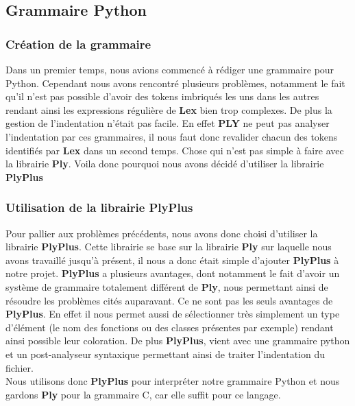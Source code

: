 \documentclass[a4paper,12pt]{article}
\begin{document}
	\subsection{Grammaire Python}

		\subsubsection{Création de la grammaire}

			Dans un premier temps, nous avions commencé à rédiger une grammaire pour Python. Cependant nous avons rencontré plusieurs problèmes, notamment le fait qu'il n'est pas possible d'avoir des tokens imbriqués les uns dans les autres rendant ainsi les expressions régulière de \textbf{Lex} bien trop complexes. De plus la gestion de l'indentation n'était pas facile. En effet \textbf{PLY} ne peut pas analyser l'indentation par ces grammaires, il nous faut donc revalider chacun des tokens identifiés par \textbf{Lex} dans un second temps. Chose qui n'est pas simple à faire avec la librairie \textbf{Ply}. Voila donc pourquoi nous avons décidé d'utiliser la librairie \textbf{PlyPlus}

		\subsubsection{Utilisation de la librairie PlyPlus}

			Pour pallier aux problèmes précédents, nous avons donc choisi d'utiliser la librairie \textbf{PlyPlus}. Cette librairie se base sur la librairie \textbf{Ply} sur laquelle nous avons travaillé jusqu'à présent, il nous a donc était simple d'ajouter \textbf{PlyPlus} à notre projet. \textbf{PlyPlus} a plusieurs avantages, dont notamment le fait d'avoir un système de grammaire totalement différent de \textbf{Ply}, nous permettant ainsi de résoudre les problèmes cités auparavant. Ce ne sont pas les seuls avantages de \textbf{PlyPlus}. En effet il nous permet aussi de sélectionner très simplement un type d'élément (le nom des fonctions ou des classes présentes par exemple) rendant ainsi possible leur coloration. De plus \textbf{PlyPlus}, vient avec une grammaire python et un post-analyseur syntaxique permettant ainsi de traiter l'indentation du fichier. \\
			
			Nous utilisons donc \textbf{PlyPlus} pour interpréter notre grammaire Python et nous gardons \textbf{Ply} pour la grammaire C, car elle suffit pour ce langage.
\end{document}

